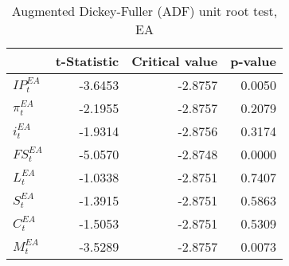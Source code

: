 


\begin{table}[t]
    \centering
    \begin{tabular}{lrrr}
        \toprule
        {} &  t-Statistic &  Critical value &  p-value \\
        \midrule
        $IP^{EA}_{t}$  &      -3.6453 &         -2.8757 &   0.0050 \\
        $\pi^{EA}_{t}$ &      -2.1955 &         -2.8757 &   0.2079 \\
        $i^{EA}_{t}$   &      -1.9314 &         -2.8756 &   0.3174 \\
        $FS^{EA}_{t}$  &      -5.0570 &         -2.8748 &   0.0000 \\
        $L^{EA}_{t}$   &      -1.0338 &         -2.8751 &   0.7407 \\
        $S^{EA}_{t}$   &      -1.3915 &         -2.8751 &   0.5863 \\
        $C^{EA}_{t}$   &      -1.5053 &         -2.8751 &   0.5309 \\
        $M^{EA}_{t}$   &      -3.5289 &         -2.8757 &   0.0073 \\
        \bottomrule
    \end{tabular}
    \caption{Augmented Dickey-Fuller (ADF) unit root test, EA}
    \label{tab:adf_ea}
\end{table}


